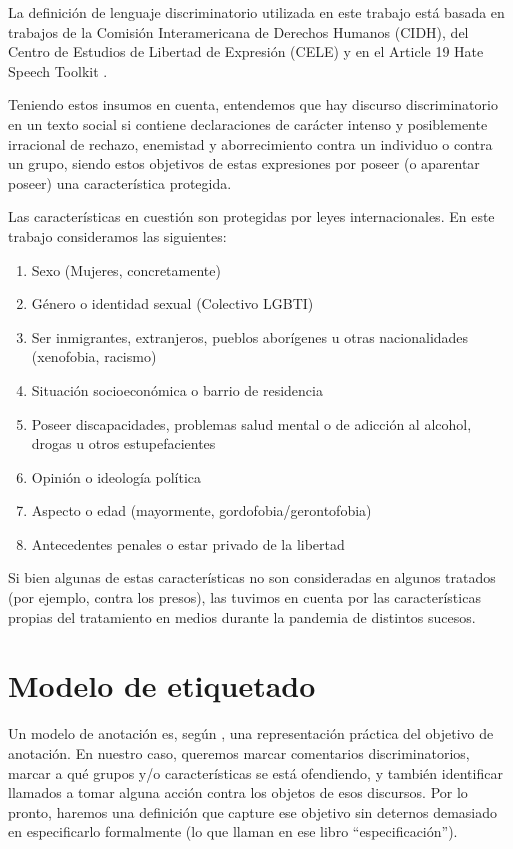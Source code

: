 La definición de lenguaje discriminatorio utilizada en este trabajo está basada en trabajos de la Comisión Interamericana de Derechos Humanos (CIDH)\cite{CIDH2015}, del Centro de Estudios de Libertad de Expresión (CELE) \cite{cele2019} y en el Article 19 Hate Speech Toolkit \cite{article192015}.

Teniendo estos insumos en cuenta, entendemos que hay discurso discriminatorio en un texto social si contiene declaraciones de carácter intenso y posiblemente irracional de rechazo, enemistad y aborrecimiento contra un individuo o contra un grupo, siendo estos objetivos de estas expresiones por poseer (o aparentar poseer) una característica protegida.

Las características en cuestión son protegidas por leyes internacionales. En este trabajo consideramos las siguientes:

\begin{enumerate}
\item Sexo (Mujeres, concretamente)
\item Género o identidad sexual (Colectivo LGBTI)
\item Ser inmigrantes, extranjeros, pueblos aborígenes u otras nacionalidades (xenofobia, racismo)
\item Situación socioeconómica o barrio de residencia
\item Poseer discapacidades, problemas salud mental o de adicción al alcohol, drogas u otros estupefacientes
\item Opinión o ideología política
\item Aspecto o edad (mayormente, gordofobia/gerontofobia)
\item Antecedentes penales o estar privado de la libertad
\end{enumerate}

Si bien algunas de estas características no son consideradas en algunos tratados (por ejemplo, contra los presos), las tuvimos en cuenta por las características propias del tratamiento en medios durante la pandemia de distintos sucesos.


\section{Modelo de etiquetado}



Un modelo de anotación es, según \citet{pustejovsky2012natural}, una representación práctica del objetivo de anotación. En nuestro caso, queremos marcar comentarios discriminatorios, marcar a qué grupos y/o características se está ofendiendo, y también identificar llamados a tomar alguna acción contra los objetos de esos discursos. Por lo pronto, haremos una definición que capture ese objetivo sin deternos demasiado en especificarlo formalmente (lo que llaman en ese libro ``especificación'').

